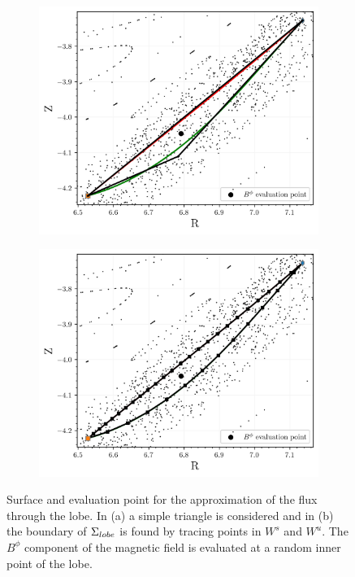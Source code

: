 \begin{figure}[H]
    \centering
    \begin{subfigure}[t]{0.49\textwidth}
        \centering
        \includegraphics[width=\textwidth]{images/turnstile/verification_triangle.png}
        \caption{}
        \label{fig:verif-triangle}
    \end{subfigure}
    \hfill
    \begin{subfigure}[t]{0.49\textwidth}
        \centering
        \includegraphics[width=\textwidth]{images/turnstile/verification_loop.png}
        \caption{}
        \label{fig:verif-shoelace}
    \end{subfigure}
    \caption{Surface and evaluation point for the approximation of the flux through the lobe. In (a) a simple triangle is considered and in (b) the boundary of $\Sigma_{lobe}$ is found by tracing points in $W^s$ and $W^u$. The $B^\phi$ component of the magnetic field is evaluated at a random inner point of the lobe.}
    \label{fig:verification}
\end{figure}

